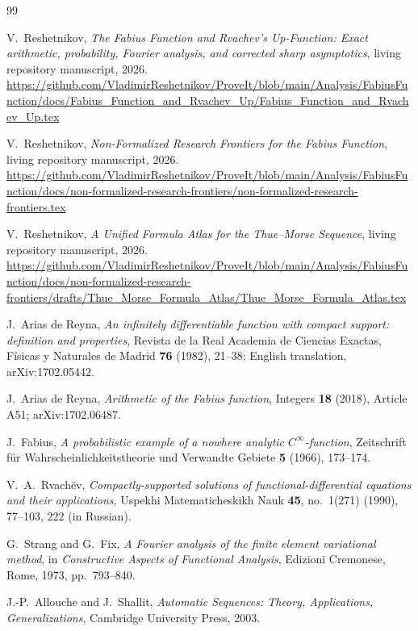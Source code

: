 \documentclass[11pt]{article}
\numberwithin{equation}{section}
\theoremstyle{definition}
\theoremstyle{remark}
\begin{document}
\begin{thebibliography}{99}

V.~Reshetnikov,
\emph{The Fabius Function and Rvachev's Up-Function: Exact arithmetic, probability, Fourier analysis, and corrected sharp asymptotics},
living repository manuscript, 2026.
\url{https://github.com/VladimirReshetnikov/ProveIt/blob/main/Analysis/FabiusFunction/docs/Fabius_Function_and_Rvachev_Up/Fabius_Function_and_Rvachev_Up.tex}

V.~Reshetnikov,
\emph{Non-Formalized Research Frontiers for the Fabius Function},
living repository manuscript, 2026.
\url{https://github.com/VladimirReshetnikov/ProveIt/blob/main/Analysis/FabiusFunction/docs/non-formalized-research-frontiers/non-formalized-research-frontiers.tex}

V.~Reshetnikov,
\emph{A Unified Formula Atlas for the Thue--Morse Sequence},
living repository manuscript, 2026.
\url{https://github.com/VladimirReshetnikov/ProveIt/blob/main/Analysis/FabiusFunction/docs/non-formalized-research-frontiers/drafts/Thue_Morse_Formula_Atlas/Thue_Morse_Formula_Atlas.tex}

J.~Arias de Reyna,
\emph{An infinitely differentiable function with compact support: definition and properties},
Revista de la Real Academia de Ciencias Exactas, F\'isicas y Naturales de Madrid
\textbf{76} (1982), 21--38; English translation, arXiv:1702.05442.

J.~Arias de Reyna,
\emph{Arithmetic of the Fabius function},
Integers \textbf{18} (2018), Article A51; arXiv:1702.06487.

J.~Fabius,
\emph{A probabilistic example of a nowhere analytic $C^\infty$-function},
Zeitschrift f\"ur Wahrscheinlichkeitstheorie und Verwandte Gebiete
\textbf{5} (1966), 173--174.

V.~A.~Rvach\"ev,
\emph{Compactly-supported solutions of functional-differential equations and their applications},
Uspekhi Matematicheskikh Nauk \textbf{45}, no.~1(271) (1990), 77--103, 222 (in Russian).

G.~Strang and G.~Fix,
\emph{A Fourier analysis of the finite element variational method},
in \emph{Constructive Aspects of Functional Analysis}, Edizioni Cremonese, Rome, 1973, pp.~793--840.

J.-P.~Allouche and J.~Shallit,
\emph{Automatic Sequences: Theory, Applications, Generalizations},
Cambridge University Press, 2003.


\end{thebibliography}
\end{document}
